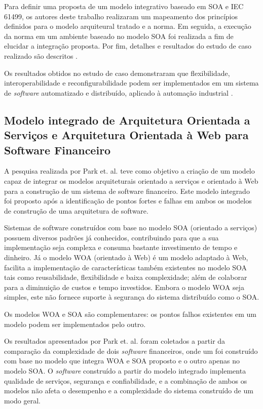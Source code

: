 Para definir uma proposta de um modelo integrativo baseado em SOA e IEC 61499, os autores deste trabalho realizaram um mapeamento dos princípios definidos para o modelo arquiteural tratado e a norma. Em seguida, a execução da norma em um ambiente baseado no modelo SOA foi realizada a fim de elucidar a integração proposta. Por fim, detalhes e resultados do estudo de caso realizado são descritos \cite{dai_bridging_2015}.

Os resultados obtidos no estudo de caso demonstraram que flexibilidade, interoperabilidade e reconfigurabilidade podem ser implementados em um sistema de \textit{software} automatizado e distribuído, aplicado à automação industrial \cite{dai_bridging_2015}.


\subsection{Modelo integrado de Arquitetura Orientada a Serviços e Arquitetura Orientada à Web para Software Financeiro}
A pesquisa realizada por Park et. al. \cite{park_integrated_2012} teve como objetivo a criação de um modelo capaz de integrar os modelos arquiteturais orientado a serviços e orientado à Web para a construção de um sistema de software financeiro. Este modelo integrado foi proposto após a identificação de pontos fortes e falhas em ambos os modelos de construção de uma arquitetura de software.

Sistemas de software construídos com base no modelo SOA (orientado a serviços) possuem diversos padrões já conhecidos, contribuindo para que a sua implementação seja complexa e consuma bastante investimento de tempo e dinheiro. Já o modelo WOA (orientado à Web) é um modelo adaptado à Web, facilita a implementação de características também existentes no modelo SOA tais como reusabilidade, flexibilidade e baixa complexidade; além de colaborar para a diminuição de custos e tempo investidos. Embora o modelo WOA seja simples, este não fornece suporte à segurança do sistema distribuído como o SOA.

Os modelos WOA e SOA são complementares: os pontos falhos existentes em um modelo podem ser implementados pelo outro.

Os resultados apresentados por Park et. al. \cite{park_integrated_2012} foram coletados a partir da comparação da complexidade de dois \textit{software} financeiros, onde um foi construído com base no modelo que integra WOA e SOA proposto e o outro apenas no modelo SOA. O \textit{software} construído a partir do modelo integrado implementa qualidade de serviços, segurança e confiabilidade, e a combinação de ambos os modelos não afeta o desempenho e a complexidade do sistema construído de um modo geral.

